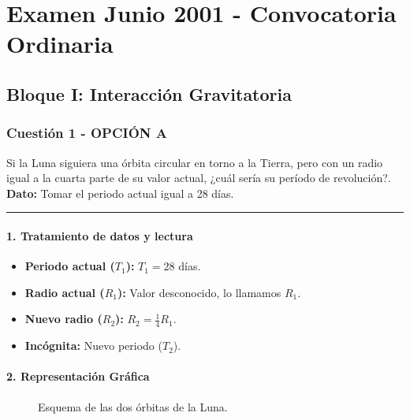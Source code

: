 \chapter{Examen Junio 2001 - Convocatoria Ordinaria}
\label{chap:2001_jun_ord}

\section{Bloque I: Interacción Gravitatoria}
\label{sec:grav_2001_jun_ord}

\subsection{Cuestión 1 - OPCIÓN A}
\label{subsec:1A_2001_jun_ord}

\begin{cajaenunciado}
Si la Luna siguiera una órbita circular en torno a la Tierra, pero con un radio igual a la cuarta parte de su valor actual, ¿cuál sería su período de revolución?.
\textbf{Dato:} Tomar el periodo actual igual a 28 días.
\end{cajaenunciado}
\hrule

\subsubsection*{1. Tratamiento de datos y lectura}
\begin{itemize}
    \item \textbf{Periodo actual ($T_1$):} $T_1 = 28$ días.
    \item \textbf{Radio actual ($R_1$):} Valor desconocido, lo llamamos $R_1$.
    \item \textbf{Nuevo radio ($R_2$):} $R_2 = \frac{1}{4} R_1$.
    \item \textbf{Incógnita:} Nuevo periodo ($T_2$).
\end{itemize}

\subsubsection*{2. Representación Gráfica}
\begin{figure}[H]
    \centering
    \caption{Esquema de las dos órbitas de la Luna.}
\end{figure}

